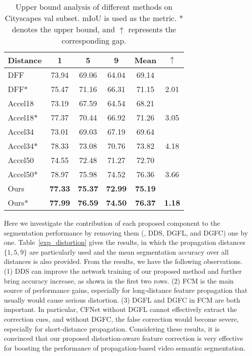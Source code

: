 \documentclass[journal]{IEEEtran}
\begin{document}
\begin{table}[t]
	\caption{Upper bound analysis of different methods on Cityscapes val subset. mIoU is used as the metric. * denotes the upper bound, and $\uparrow$ represents the corresponding gap.}
	\begin{center}
		\renewcommand{\arraystretch}{1.3}
		\begin{tabular}{l|c|c|c|c|c}
			\hline
			Distance            & 1				& 5				& 9 			& Mean   		& $\uparrow$   	\\
			\hline
			DFF          		& 73.94			& 69.06 		& 64.04 		& 69.14			&				\\
			DFF*	 			& 75.47			& 71.16			& 66.31			& 71.15 		& 2.01			\\
			\hline
			Accel18 			& 73.19			& 67.59			& 64.54			& 68.21			&				\\
			Accel18* 			& 77.37			& 70.44			& 66.92			& 71.26 		& 3.05			\\
			\hline
			Accel34 			& 73.01			& 69.03			& 67.19			& 69.64			&				\\
			Accel34* 			& 78.33			& 73.08			& 70.76			& 73.82			& 4.18			\\
			\hline
			Accel50 			& 74.55			& 72.48			& 71.27			& 72.70			&				\\
			Accel50* 			& 78.97			& 75.98			& 74.52			& 76.36			& 3.66			\\
			\hline
			Ours 				& \bf{77.33}	& \bf{75.37}	& \bf{72.99}	& \bf{75.19}	&				\\
			Ours*	 			& \bf{77.99}	& \bf{76.59}	& \bf{74.50}	& \bf{76.37}	& \bf{1.18}		\\
			\hline
		\end{tabular}
	\end{center}
	\label{exp_upper_bound}
\end{table}

Here we investigate the contribution of each proposed component to the segmentation performance by removing them (\ie, DDS, DGFL, and DGFC) one by one. Table~\ref{exp_distortion} gives the results, in which the propagation distances $\{1,5,9\}$ are particularly used and the mean segmentation accuracy over all distances is also provided.
From the results, we have the following observations. (1) DDS can improve the network training of our proposed method and further bring accuracy increase, as shown in the first two rows.  (2) FCM is the main source of performance gains, especially for long-distance feature propagation that usually would cause serious distortion. (3) DGFL and DGFC in FCM are both important. In particular, CFNet without DGFL cannot effectively extract the correction cues, and without DGFC, the false correction would become severe, especially for short-distance propagation. 
Considering these results, it is convinced that our proposed distortion-aware feature correction is very effective for boosting the performance of propagation-based video semantic segmentation.
\end{document}
